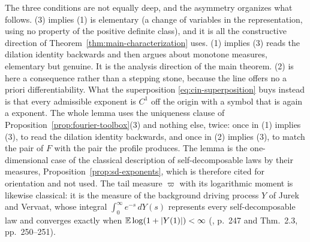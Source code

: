 The three conditions are not equally deep, and the asymmetry organizes what follows. (3)
implies (1) is elementary (a change of variables in the representation, using no property
of the positive definite class), and it is all the constructive direction of
Theorem~\ref{thm:main-characterization} uses. (1) implies (3) reads the dilation
identity backwards and then argues about monotone measures, elementary but genuine. It is
the analysis direction of the main theorem. (2) is here a consequence rather than a stepping
stone, because the line offers no a priori differentiability. What the superposition
\ref{eq:cin-superposition} buys instead is that
every admissible exponent is $C^1$ off the origin with a symbol that is again a \Levy{}
exponent. The whole lemma uses the uniqueness clause of
Proposition~\ref{prop:fourier-toolbox}(3) and nothing else, twice: once in (1) implies (3),
to read the dilation identity backwards, and once in (2) implies (3), to match the pair of
$F$ with the pair the profile produces. The lemma is the one-dimensional case of the
classical description of self-decomposable laws by their \Levy{} measures,
Proposition~\ref{prop:sd-exponents}, which is therefore cited for orientation and not used.
The tail measure $\varpi$ with its logarithmic moment is likewise classical: it is the
\Levy{} measure of the background driving \Levy{} process $Y$ of Jurek and Vervaat, whose
integral $\int_0^\infty e^{-s}\,dY(s)$ represents every self-decomposable law and converges
exactly when $\mathbb{E}\log(1 + |Y(1)|) < \infty$ (, p.~247 and
Thm.~2.3, pp.~250--251).

